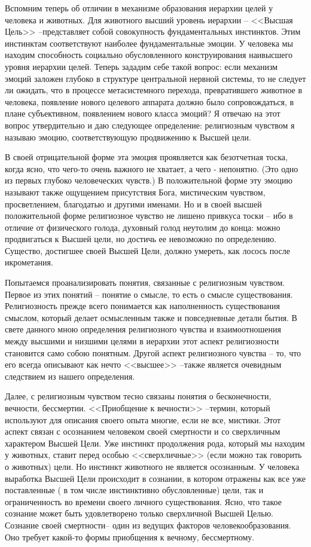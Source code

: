 \documentclass{book}
\begin{document}
Вспомним теперь об отличии в механизме образования иерархии целей у человека и животных. Для животного высший уро­вень иерархии -- <<Высшая Цель>> --представляет собой совокуп­ность фундаментальных инстинктов. Этим инстинктам соот­ветствуют наиболее фундаментальные эмоции. У человека мы находим способность социально обусловленного конструиро­вания наивысшего уровня иерархии целей. Теперь зададим се­бе такой вопрос: если механизм эмоций заложен глубоко в структуре центральной нервной системы, то не следует ли ожи­дать, что в процессе метасистемного перехода, превратившего животное в человека, появление нового целевого аппарата должно было сопровождаться, в плане субъективном, появле­нием нового класса эмоций?
Я отвечаю на этот вопрос утвердительно и даю следующее определение: религиозным чувством я называю эмоцию, соот­ветствующую продвижению к Высшей цели.

В своей отрицательной форме эта эмоция проявляется как безотчетная тоска, когда ясно, что чего-то очень важного не хва­тает, а чего - непонятно. (Это одно из первых глубоко челове­ческих чувств.) В положительной форме эту эмоцию называют также ощущением присутствия Бога, мистическим чувством, просветлением, благодатью и другими именами. Но и в своей высшей положительной форме религиозное чувство не лишено привкуса тоски -- ибо в отличие от физического голода, духов­ный голод неутолим до конца: можно продвигаться к Высшей цели, но достичь ее невозможно по определению. Существо, достигшее своей Высшей Цели, должно умереть, как лосось пос­ле икрометания.

Попытаемся проанализировать понятия, связанные с рели­гиозным чувством. Первое из этих понятий -- понятие о смысле, то есть о смысле существования. Религиозность прежде всего понимается как наполненность существования смыслом, кото­рый делает осмысленным также и повседневные детали бытия. В свете данного мною определения религиозного чувства и взаимоотношения между высшими и низшими целями в иерар­хии этот аспект религиозности становится само собою понят­ным. Другой аспект религиозного чувства -- то, что его всегда описывают как нечто <<высшее>> --также является очевидным следствием из нашего определения.

Далее, с религиозным чувством тесно связаны понятия о бесконечности, вечности, бессмертии. <<Приобщение к вечности>> --термин, который используют для описания своего опы­та многие, если не все, мистики. Этот аспект связан с осозна­нием человеком своей смертности и со сверхличным  характе­ром Высшей Цели. Уже инстинкт продолжения рода, который мы находим у животных, ставит перед особью <<сверхличные>> (если можно так говорить о животных) цели. Но инстинкт жи­вотного не является осознанным. У человека выработка Выс­шей Цели происходит в сознании, в котором отражены как все уже поставленные ( в том числе инстинктивно обусловленные) цели, так и ограниченность во времени своего личного сущест­вования. Ясно, что такое сознание может быть удовлетворено только сверхличной Высшей Целью. Сознание своей смертно­сти-- один из ведущих факторов человекообразования. Оно тре­бует какой-то формы приобщения к вечному, бессмертному.
\end{document}

